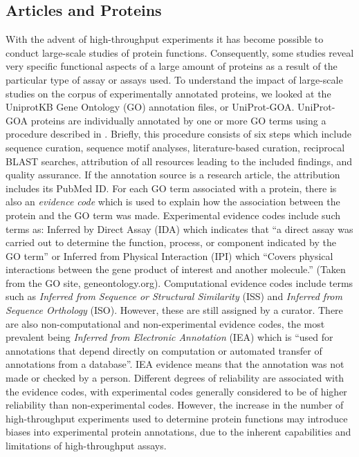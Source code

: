\documentclass[12pt]{article}
\begin{document}
\subsection*{Articles and Proteins} With the advent of high-throughput experiments it has
become possible to conduct large-scale studies of protein functions.  Consequently, some
studies reveal very specific functional aspects of a large amount of proteins as a result of
the particular type of assay or assays used. To understand the impact of large-scale studies
on the corpus of experimentally annotated proteins, we looked at the UniprotKB Gene Ontology
(GO) annotation files, or UniProt-GOA. UniProt-GOA proteins are individually annotated by one or
more GO terms using a procedure described in \cite{Dimmer2012UniProtGO}. Briefly, this
procedure consists of six steps which include sequence curation, sequence motif analyses,
literature-based curation, reciprocal BLAST\cite{Altschul1997Gapped} searches, attribution
of all resources leading to the included findings, and quality assurance. If the annotation
source is a research article, the attribution includes its PubMed ID. For each GO term
associated with a protein, there is also an \textit{evidence code} which is used to explain
how the association between the protein and the GO term was made.  Experimental evidence
codes include such terms as: Inferred by Direct Assay (IDA) which indicates that ``a direct
assay was carried out to determine the function, process, or component indicated by the GO
term'' or Inferred from Physical Interaction (IPI) which ``Covers physical interactions
between the gene product of interest and another molecule.'' (Taken from the GO site,
geneontology.org).  Computational evidence codes include terms such as \textit{Inferred from
Sequence or Structural Similarity} (ISS) and \textit{Inferred from Sequence Orthology}
(ISO).  However, these are still assigned by a curator. There are also non-computational and
non-experimental evidence codes, the most prevalent being \textit{Inferred from Electronic
Annotation} (IEA) which is ``used for annotations that depend directly on computation or
automated transfer of annotations from a database''. IEA evidence means that the annotation
was not made or checked by a person.  Different degrees of reliability are associated with
the evidence codes, with experimental codes generally considered to be of higher reliability
than non-experimental codes. However, the increase in the number of high-throughput
experiments used to determine protein functions may introduce biases into experimental protein
annotations, due to the inherent capabilities and limitations of high-throughput assays.  
\end{document}
